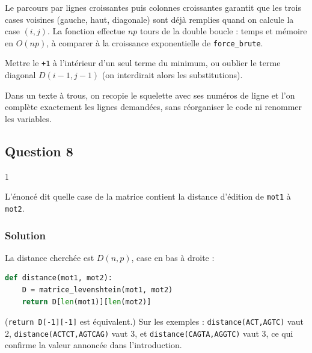\documentclass[11pt,a4paper]{article}
\begin{document}
Le parcours par lignes croissantes puis colonnes croissantes garantit que les trois cases voisines (gauche, haut, diagonale) sont déjà remplies quand on calcule la case \((i,j)\). La fonction effectue \(np\) tours de la double boucle : temps et mémoire en \(O(np)\), à comparer à la croissance exponentielle de \texttt{force\_brute}.

\begin{piege}

Mettre le \texttt{+1} à l'intérieur d'un seul terme du minimum, ou oublier le terme diagonal \(D(i-1,j-1)\) (on interdirait alors les substitutions).

\end{piege}

\begin{jury}

Dans un texte à trous, on recopie le squelette avec ses numéros de ligne et l'on complète exactement les lignes demandées, sans réorganiser le code ni renommer les variables.

\end{jury}

\hypertarget{question-8}{%
\subsection{Question 8}\label{question-8}}

\begin{indication}{1}

L'énoncé dit quelle case de la matrice contient la distance d'édition de \texttt{mot1} à \texttt{mot2}.

\end{indication}

\hypertarget{solution-10}{%
\subsubsection{Solution}\label{solution-10}}

La distance cherchée est \(D(n,p)\), case en bas à droite :

\begin{lstlisting}[language=Python]
def distance(mot1, mot2):
    D = matrice_levenshtein(mot1, mot2)
    return D[len(mot1)][len(mot2)]
\end{lstlisting}

(\texttt{return\ D{[}-1{]}{[}-1{]}} est équivalent.) Sur les exemples : \texttt{distance(\allowbreak{}\textquotesingle{}ACT\textquotesingle{},\allowbreak{}\textquotesingle{}AGTC\textquotesingle{})\allowbreak{}} vaut 2, \texttt{distance(\allowbreak{}\textquotesingle{}ACTCT\textquotesingle{},\allowbreak{}\textquotesingle{}AGTCAG\textquotesingle{})\allowbreak{}} vaut 3, et \texttt{distance(\allowbreak{}\textquotesingle{}CAGTA\textquotesingle{},\allowbreak{}\textquotesingle{}AGGTC\textquotesingle{})\allowbreak{}} vaut 3, ce qui confirme la valeur annoncée dans l'introduction.
\end{document}
